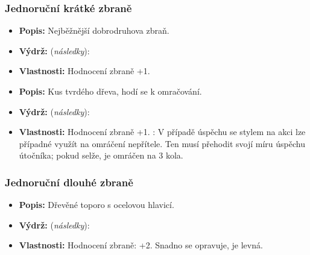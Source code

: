 \documentclass[../main.tex]{subfiles}
\begin{document}

\subsubsection{Jednoruční krátké zbraně}
\label{sec:zbrane_jedna}

\begin{Predmet}[Dýka]
\begin{itemize}
	\item \textbf{Popis:} Nejběžnější dobrodruhova zbraň.
	\item \textbf{Výdrž:} (\emph{následky}): 
	\item \textbf{Vlastnosti:} Hodnocení zbraně +1. 
\end{itemize}
\end{Predmet}

\begin{Predmet}[Obušek]
\begin{itemize}
	\item \textbf{Popis:} Kus tvrdého dřeva, hodí se k omračování.
	\item \textbf{Výdrž:} (\emph{následky}):  
	\item \textbf{Vlastnosti:} Hodnocení zbraně +1. : V případě úspěchu se stylem na akci  lze případné  využít na omráčení nepřítele. Ten musí přehodit svojí  míru úspěchu útočníka; pokud selže, je omráčen na 3 kola.
\end{itemize}
\end{Predmet}

\subsubsection{Jednoruční dlouhé zbraně}
\label{sec:zbrane_dva}

\begin{Predmet}[Sekera]
\begin{itemize}
	\item \textbf{Popis:} Dřevěné toporo s ocelovou hlavicí.
	\item \textbf{Výdrž:} (\emph{následky}): 
	\item \textbf{Vlastnosti:} Hodnocení zbraně: +2. Snadno se opravuje, je levná.
\end{itemize}
\end{Predmet}
\end{document}
